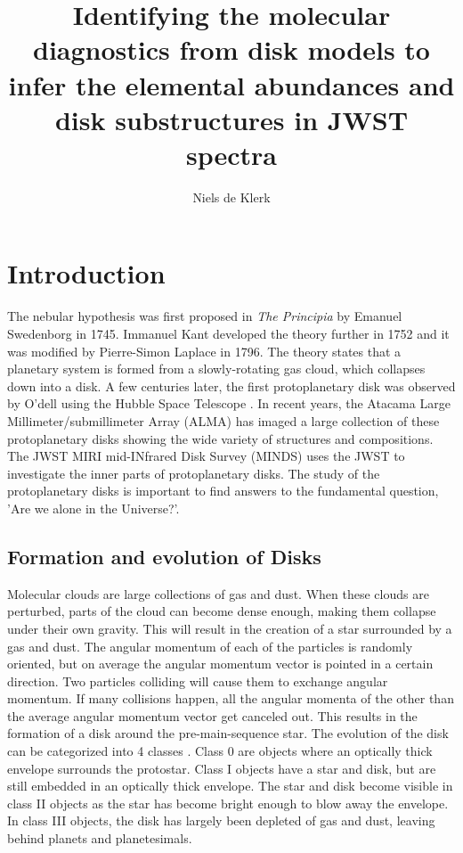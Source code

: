 \documentclass[twoside,single]{lion-msc}
\title{Identifying the molecular diagnostics from disk models to infer the elemental abundances and disk substructures in JWST spectra}
\author{Niels de Klerk}
\affiliation{Leiden Observatory, Universiteit Leiden}
\date{\displaydate{date}}
\begin{document}

\maketitle

\tableofcontents
\cleardoublepage
{}
\chapter{Introduction}
The nebular hypothesis was first proposed in \textit{The Principia} by Emanuel Swedenborg in 1745. Immanuel Kant developed the theory further in 1752 and it was modified by Pierre-Simon Laplace in 1796. The theory states that a planetary system is formed from a slowly-rotating gas cloud, which collapses down into a disk. A few centuries later, the first protoplanetary disk was observed by O'dell using the Hubble Space Telescope \citep{ODell1993}. In recent years, the Atacama Large Millimeter/submillimeter Array (ALMA) has imaged a large collection of these protoplanetary disks showing the wide variety of structures and compositions. The JWST MIRI mid-INfrared Disk Survey (MINDS) uses the JWST to investigate the inner parts of protoplanetary disks. The study of the protoplanetary disks is important to find answers to the fundamental question, 'Are we alone in the Universe?'.
\section{Formation and evolution of Disks}
Molecular clouds are large collections of gas and dust. When these clouds are perturbed, parts of the cloud can become dense enough, making them collapse under their own gravity. This will result in the creation of a star surrounded by a gas and dust. The angular momentum of each of the particles is randomly oriented, but on average the angular momentum vector is pointed in a certain direction. Two particles colliding will cause them to exchange angular momentum. If many collisions happen, all the angular momenta of the other than the average angular momentum vector get canceled out. This results in the formation of a disk around the pre-main-sequence star.
The evolution of the disk can be categorized into 4 classes \cite{1987ApJ...312..788A}. Class 0 are objects where an optically thick envelope surrounds the protostar. Class I objects have a star and disk, but are still embedded in an optically thick envelope. The star and disk become visible in class II objects as the star has become bright enough to blow away the envelope. In class III objects, the disk has largely been depleted of gas and dust, leaving behind planets and planetesimals. 
\end{document}
